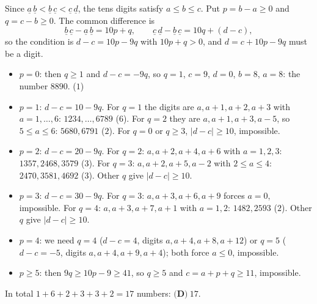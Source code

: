 Since $\underline{a}\,\underline{b}<\underline{b}\,\underline{c}<\underline{c}\,\underline{d}$, the tens digits satisfy $a\le b\le c$. Put $p=b-a\ge0$ and $q=c-b\ge0$. The common difference is
\[\underline{b}\,\underline{c}-\underline{a}\,\underline{b}=10p+q,\qquad\underline{c}\,\underline{d}-\underline{b}\,\underline{c}=10q+(d-c),\]
so the condition is $d-c=10p-9q$ with $10p+q>0$, and $d=c+10p-9q$ must be a digit.
\begin{itemize}
\item $p=0$: then $q\ge1$ and $d-c=-9q$, so $q=1$, $c=9$, $d=0$, $b=8$, $a=8$: the number $8890$. \hfill($1$)
\item $p=1$: $d-c=10-9q$. For $q=1$ the digits are $a,a+1,a+2,a+3$ with $a=1,\dots,6$: $1234,\dots,6789$ \hfill($6$). For $q=2$ they are $a,a+1,a+3,a-5$, so $5\le a\le6$: $5680,6791$ \hfill($2$). For $q=0$ or $q\ge3$, $|d-c|\ge10$, impossible.
\item $p=2$: $d-c=20-9q$. For $q=2$: $a,a+2,a+4,a+6$ with $a=1,2,3$: $1357,2468,3579$ \hfill($3$). For $q=3$: $a,a+2,a+5,a-2$ with $2\le a\le4$: $2470,3581,4692$ \hfill($3$). Other $q$ give $|d-c|\ge10$.
\item $p=3$: $d-c=30-9q$. For $q=3$: $a,a+3,a+6,a+9$ forces $a=0$, impossible. For $q=4$: $a,a+3,a+7,a+1$ with $a=1,2$: $1482,2593$ \hfill($2$). Other $q$ give $|d-c|\ge10$.
\item $p=4$: we need $q=4$ ($d-c=4$, digits $a,a+4,a+8,a+12$) or $q=5$ ($d-c=-5$, digits $a,a+4,a+9,a+4$); both force $a\le0$, impossible.
\item $p\ge5$: then $9q\ge10p-9\ge41$, so $q\ge5$ and $c=a+p+q\ge11$, impossible.
\end{itemize}
In total $1+6+2+3+3+2=17$ numbers: $\boxed{\textbf{(D)}\ 17}$.
